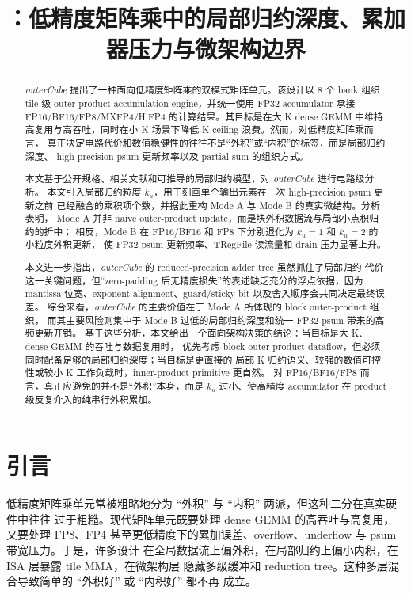 \documentclass[UTF8,11pt,a4paper]{ctexart}
\title{\textbf{\outercube{}：低精度矩阵乘中的局部归约深度、累加器压力与微架构边界}}
\author{}
\date{}
\newcommand{\ku}{\ensuremath{k_u}}
\newcommand{\modea}{Mode A}
\newcommand{\modeb}{Mode B}
\newcommand{\outercube}{\textit{outerCube}}
\begin{document}
\maketitle

\begin{abstract}
\outercube{} 提出了一种面向低精度矩阵乘的双模式矩阵单元。该设计以 8 个 bank
组织 tile 级 outer-product accumulation engine，并统一使用 FP32 accumulator
承接 FP16/BF16/FP8/MXFP4/HiFP4 的计算结果。其目标是在大 K dense GEMM 中维持
高复用与高吞吐，同时在小 K 场景下降低 K-ceiling 浪费。然而，对低精度矩阵乘而言，
真正决定电路代价和数值稳健性的往往不是“外积”或“内积”的标签，而是局部归约深度、
high-precision psum 更新频率以及 partial sum 的组织方式。

本文基于公开规格、相关文献和可推导的局部归约模型，对 \outercube{} 进行电路级分析。
本文引入局部归约粒度 \ku{}，用于刻画单个输出元素在一次 high-precision psum 更新之前
已经融合的乘积项个数，并据此重构 \modea{} 与 \modeb{} 的真实微结构。分析表明，
\modea{} 并非 naive outer-product update，而是块外积数据流与局部小点积归约的折中；
相反，\modeb{} 在 FP16/BF16 和 FP8 下分别退化为 $\ku=1$ 和 $\ku=2$ 的小粒度外积更新，
使 FP32 psum 更新频率、TRegFile 读流量和 drain 压力显著上升。

本文进一步指出，\outercube{} 的 reduced-precision adder tree 虽然抓住了局部归约
代价这一关键问题，但“zero-padding 后无精度损失”的表述缺乏充分的浮点依据，因为
mantissa 位宽、exponent alignment、guard/sticky bit 以及舍入顺序会共同决定最终误差。
综合来看，\outercube{} 的主要价值在于 \modea{} 所体现的 block outer-product 组织，
而其主要风险则集中于 \modeb{} 过低的局部归约深度和统一 FP32 psum 带来的高频更新开销。
基于这些分析，本文给出一个面向架构决策的结论：当目标是大 K、dense GEMM 的吞吐与数据复用时，
优先考虑 block outer-product dataflow，但必须同时配备足够的局部归约深度；当目标是更直接的
局部 K 归约语义、较强的数值可控性或较小 K 工作负载时，inner-product primitive 更自然。
对 FP16/BF16/FP8 而言，真正应避免的并不是“外积”本身，而是 \ku{} 过小、使高精度 accumulator
在 product 级反复介入的纯串行外积累加。
\end{abstract}

\section{引言}

低精度矩阵乘单元常被粗略地分为 ``外积'' 与 ``内积'' 两派，但这种二分在真实硬件中往往
过于粗糙。现代矩阵单元既要处理 dense GEMM 的高吞吐与高复用，又要处理 FP8、FP4
甚至更低精度下的累加误差、overflow、underflow 与 psum 带宽压力。于是，许多设计
在全局数据流上偏外积，在局部归约上偏小内积，在 ISA 层暴露 tile MMA，在微架构层
隐藏多级缓冲和 reduction tree。这种多层混合导致简单的 ``外积好'' 或 ``内积好'' 都不再
成立。
\end{document}

